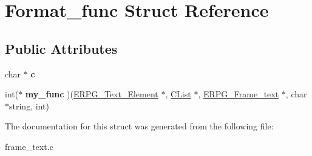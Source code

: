 \hypertarget{structFormat__func}{\section{Format\-\_\-func Struct Reference}
\label{structFormat__func}
}
\subsection*{Public Attributes}
\begin{DoxyCompactItemize}
\item 
\hypertarget{structFormat__func_a1a995f0112bcafdb4b97bef96115e23e}{char $\ast$ {\bfseries c}}\label{structFormat__func_a1a995f0112bcafdb4b97bef96115e23e}

\item 
\hypertarget{structFormat__func_a36910c7681ba24ee33854526045b5b3c}{int($\ast$ {\bfseries my\-\_\-func} )(\hyperlink{structERPG__Text__Element}{E\-R\-P\-G\-\_\-\-Text\-\_\-\-Element} $\ast$, \hyperlink{structCList}{C\-List} $\ast$, \hyperlink{structERPG__Frame__text}{E\-R\-P\-G\-\_\-\-Frame\-\_\-text} $\ast$, char $\ast$string, int)}\label{structFormat__func_a36910c7681ba24ee33854526045b5b3c}

\end{DoxyCompactItemize}


The documentation for this struct was generated from the following file\-:\begin{DoxyCompactItemize}
\item 
frame\-\_\-text.\-c\end{DoxyCompactItemize}
